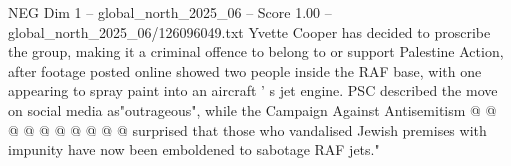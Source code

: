 \begin{textsample}{NEG Dim 1 – global\_north\_2025\_06 – Score 1.00 – global\_north\_2025\_06/126096049.txt}
Yvette Cooper has decided to proscribe the group, making it a criminal offence to belong to or support Palestine Action, after footage posted online showed two people inside the RAF base, with one appearing to spray paint into an aircraft ' s jet engine.
PSC described the move on social media as"outrageous", while the Campaign Against Antisemitism @ @ @ @ @ @ @ @ @ @ surprised that those who vandalised Jewish premises with impunity have now been emboldened to sabotage RAF jets."

\end{textsample}
